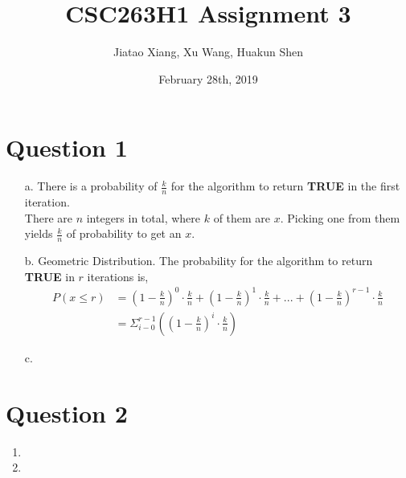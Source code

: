 \documentclass[10pt]{article}
\title{CSC263H1 Assignment 3}
\author{Jiatao Xiang, Xu Wang, Huakun Shen}
\date{February 28th, 2019}
\begin{document}
\maketitle
\section*{Question 1}
\begin{enumerate}
\item[a.] There is a probability of $\frac{k}{n}$ for the algorithm to return \textbf{TRUE} in the first iteration.\\
There are $n$ integers in total, where $k$ of them are $x$. Picking one from them yields $\frac{k}{n}$ of probability to get an $x$.

\item[b.] Geometric Distribution. The probability for the algorithm to return \textbf{TRUE} in $r$ iterations is,
\begin{align*}
P(x\leq r)&=(1-\frac{k}{n})^0\cdot \frac{k}{n}+(1-\frac{k}{n})^1\cdot \frac{k}{n}+...+(1-\frac{k}{n})^{r-1}\cdot \frac{k}{n}\\
&=\Sigma^{r-1}_{i-0}((1-\frac{k}{n})^i\cdot \frac{k}{n})
\end{align*}



\item[c.] 
\end{enumerate}

\section*{Question 2}
\begin{enumerate}
\item
\item
\end{enumerate}
\end{document}
